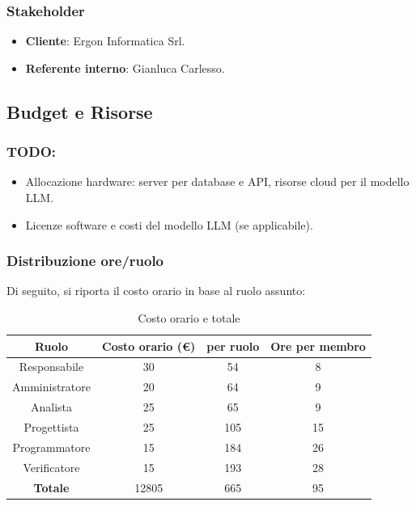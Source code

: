 \documentclass{article}
\begin{document}
        \subsubsection{Stakeholder}
        \begin{itemize}
            \item \textbf{Cliente}: Ergon Informatica Srl.
            \item \textbf{Referente interno}: Gianluca Carlesso.
        \end{itemize}

    \subsection{Budget e Risorse}
        \subsubsection{TODO: }
        \begin{itemize}
            \item Allocazione hardware: server per database e API, risorse cloud per il modello LLM.
            \item Licenze software e costi del modello LLM (se applicabile).
        \end{itemize}
        \subsubsection{Distribuzione ore/ruolo}
        Di seguito, si riporta il costo orario in base al ruolo assunto:
        \begin{table}[!h]
            \begin{center}
                \begin{tabular}{ |c|c|c|c| }
                    \hline
                    \textbf{Ruolo}          & \textbf{Costo orario} (\euro) &  \textbf{per ruolo}   & \textbf{Ore per membro} \\
                    \hline          
                    Responsabile   & 30           &     54       &       8        \\
                    Amministratore & 20           &     64       &       9        \\
                    Analista       & 25           &     65       &       9       \\
                    Progettista    & 25           &     105      &       15       \\
                    Programmatore  & 15           &     184      &       26       \\
                    Verificatore   & 15           &     193      &       28       \\
                    \hline
                    \textbf{Totale}         &    12805    &     665       &       95       \\
                    \hline
                \end{tabular}
                \caption{Costo orario e totale}
            \end{center}
        \end{table}
\end{document}
